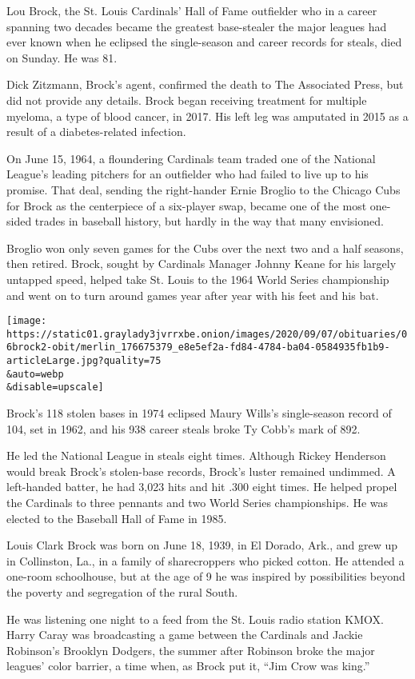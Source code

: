 Lou Brock, the St. Louis Cardinals' Hall of Fame outfielder who in a
career spanning two decades became the greatest base-stealer the major
leagues had ever known when he eclipsed the single-season and career
records for steals, died on Sunday. He was 81.

Dick Zitzmann, Brock's agent, confirmed the death to The Associated
Press, but did not provide any details. Brock began receiving treatment
for multiple myeloma, a type of blood cancer, in 2017. His left leg was
amputated in 2015 as a result of a diabetes-related infection.

On June 15, 1964, a floundering Cardinals team traded one of the
National League's leading pitchers for an outfielder who had failed to
live up to his promise. That deal, sending the right-hander Ernie
Broglio to the Chicago Cubs for Brock as the centerpiece of a six-player
swap, became one of the most one-sided trades in baseball history, but
hardly in the way that many envisioned.

Broglio won only seven games for the Cubs over the next two and a half
seasons, then retired. Brock, sought by Cardinals Manager Johnny Keane
for his largely untapped speed, helped take St. Louis to the 1964 World
Series championship and went on to turn around games year after year
with his feet and his bat.

\texttt{[image: https://static01.graylady3jvrrxbe.onion/images/2020/09/07/obituaries/06brock2-obit/merlin\_176675379\_e8e5ef2a-fd84-4784-ba04-0584935fb1b9-articleLarge.jpg?quality=75\\\&auto=webp\\\&disable=upscale]}

Brock's 118 stolen bases in 1974 eclipsed Maury Wills's single-season
record of 104, set in 1962, and his 938 career steals broke Ty Cobb's
mark of 892.

He led the National League in steals eight times. Although Rickey
Henderson would break Brock's stolen-base records, Brock's luster
remained undimmed. A left-handed batter, he had 3,023 hits and hit .300
eight times. He helped propel the Cardinals to three pennants and two
World Series championships. He was elected to the Baseball Hall of Fame
in 1985.

Louis Clark Brock was born on June 18, 1939, in El Dorado, Ark., and
grew up in Collinston, La., in a family of sharecroppers who picked
cotton. He attended a one-room schoolhouse, but at the age of 9 he was
inspired by possibilities beyond the poverty and segregation of the
rural South.

He was listening one night to a feed from the St. Louis radio station
KMOX. Harry Caray was broadcasting a game between the Cardinals and
Jackie Robinson's Brooklyn Dodgers, the summer after Robinson broke the
major leagues' color barrier, a time when, as Brock put it, ``Jim Crow
was king.''

